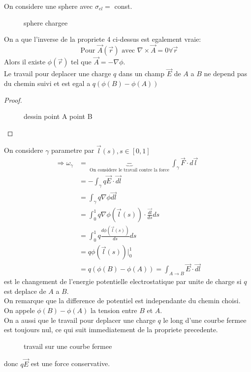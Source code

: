 \documentclass[../main.tex]{subfiles}
\begin{document}
\begin{exemple}
On considere une sphere avec $\sigma_{el} =$ const.
\begin{figure}[H]
    \centering
    \caption{sphere chargee}
    \label{fig:sphere-chargee}
\end{figure}
\end{exemple}
On a que l'inverse de la propriete 4 ci-dessus est egalement vraie:
\[ 
	\text{ Pour } \vec{A}( \vec{r}) \text{ avec } \nabla\times \vec{A} = 0 \forall \vec{r}
\]
Alors il existe $\phi( \vec{r}) $ tel que $\vec{A}= - \nabla \phi$.\\
Le travail pour deplacer une charge $q$ dans un champ $\vec{E}$ de $A $ a $B$ ne depend pas du chemin suivi et est egal a $q ( \phi( B) - \phi( A) ) $
\begin{proof}
\begin{figure}[H]
    \centering
    \caption{dessin point A point B}
    \label{fig:dessin-point-a-point-b}
\end{figure}
\end{proof}
On considere $\gamma$ parametre par $\vec{l}( s) , s\in [ 0,1] $ \\
\begin{align*}
\Rightarrow \omega_\gamma &= \underbrace{-}_{ \text{ On considere le travail contre la force } } \int_{\gamma} \vec{F} \cdot d \vec{l}\\
&= - \int_{\gamma} q \vec{E} \cdot \vec{dl}\\
&= \int_{\gamma}  q \nabla \phi \vec{dl}\\
&= \int_{ 0 }^{ 1 }q \nabla \phi( \vec{l}( s) ) \cdot \frac{\vec{dl}}{ds}ds\\
&= \int_{ 0 }^{ 1 } q \frac{d \phi( \vec{l}( s) ) }{ds} ds\\
&= q \phi( \vec{l}( s) ) \vert_{0} ^{1}\\
&= q ( \phi( B) - \phi( A)  ) = \int_{A\to B}  \vec{E} \cdot \vec{dl} 
\end{align*}
est le changement de l'energie potentielle electrostatique par unite de charge si $q$ est deplace de $A$ a $B$.\\
On remarque que la difference de potentiel est independante du chemin choisi.\\
On appele $\phi( B) - \phi( A) $ la tension entre $B$ et $A$.\\

On a aussi que le travail pour deplacer une charge $q$ le long d'une courbe fermee est toujours nul, ce qui suit immediatement de la propriete precedente.\\
\begin{figure}[H]
    \centering
    \caption{travail sur une courbe fermee}
    \label{fig:travail-sur-une-courbe-fermee}
\end{figure}
donc $q \vec{E}$ est une force conservative.\\
\end{document}
